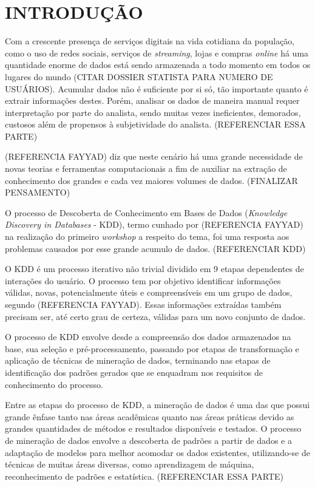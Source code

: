 
%

\chapter{INTRODUÇÃO}
\label{chap:introducao}

Com a crescente presença de serviços digitais na vida cotidiana da população, como o uso de redes sociais, serviços de \textit{streaming}, lojas e compras \textit{online} há uma quantidade enorme de dados está sendo armazenada a todo momento em todos os lugares do mundo (CITAR DOSSIER STATISTA PARA NUMERO DE USUÁRIOS). Acumular dados não é suficiente por si só, tão importante quanto é extrair informações destes. Porém, analisar os dados de maneira manual requer interpretação por parte do analista, sendo muitas vezes ineficientes, demorados, custosos além de propensos à subjetividade do analista. (REFERENCIAR ESSA PARTE)

(REFERENCIA FAYYAD) diz que neste cenário há uma grande necessidade de novas teorias e ferramentas computacionais a fim de auxiliar na extração de conhecimento dos grandes e cada vez maiores volumes de dados. (FINALIZAR PENSAMENTO)

O processo de Descoberta de Conhecimento em Bases de Dados (\textit{Knowledge Discovery in Databases} - KDD), termo cunhado por (REFERENCIA FAYYAD) na realização do primeiro \textit{workshop} a respeito do tema, foi uma resposta aos problemas causados por esse grande acumulo de dados. (REFERENCIAR KDD)

O KDD é um processo iterativo não trivial dividido em 9 etapas dependentes de interações do usuário. O processo tem por objetivo identificar informações válidas, novas, potencialmente úteis e compreensíveis em um grupo de dados, segundo (REFERENCIA FAYYAD). Essas informações extraídas também precisam ser, até certo grau de certeza, válidas para um novo conjunto de dados.

O processo de KDD envolve desde a compreensão dos dados armazenados na base, sua seleção e pré-processamento, passando por etapas de transformação e aplicação de técnicas de mineração de dados, terminando nas etapas de identificação dos padrões gerados que se enquadram nos requisitos de conhecimento do processo.

Entre as etapas do processo de KDD, a mineração de dados é uma das que possui grande ênfase tanto nas áreas acadêmicas quanto nas áreas práticas devido as grandes quantidades de métodos e resultados disponíveis e testados. O processo de mineração de dados envolve a descoberta de padrões a partir de dados e a adaptação de modelos para melhor acomodar os dados existentes, utilizando-se de técnicas de muitas áreas diversas, como aprendizagem de máquina, reconhecimento de padrões e estatística. (REFERENCIAR ESSA PARTE)

